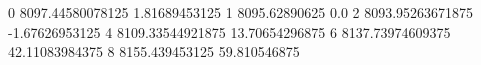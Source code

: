 0 8097.44580078125 1.81689453125
1 8095.62890625 0.0
2 8093.95263671875 -1.67626953125
4 8109.33544921875 13.70654296875
6 8137.73974609375 42.11083984375
8 8155.439453125 59.810546875
